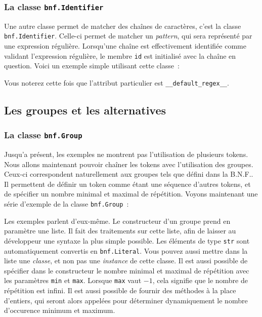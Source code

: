 \documentclass[a4paper]{article}
\newcommand{\insertpython}[1]{%
{\ttfamily}%
}
\newcommand{\fixed}[1]{\texttt{#1}}
\newcommand{\bnf}{B.N.F.}
\begin{document}
            \subsubsection{La classe \fixed{bnf.Identifier}}
                Une autre classe permet de matcher des chaînes de caractères,
                c'est la classe \fixed{bnf.Identifier}. Celle-ci permet de
                matcher un \emph{pattern}, qui sera représenté par une expression
                régulière. Lorsqu'une chaîne est effectivement identifiée comme
                validant l'expression régulière, le membre \fixed{id} est
                initialisé avec la chaîne en question.
                Voici un exemple simple utilisant cette classe~:
                \insertpython{listings/bnf/ex03.py}

                Vous noterez cette fois que l'attribut particulier est
                \fixed{\_\_default\_regex\_\_}.

        \subsection{Les groupes et les alternatives}

            \subsubsection{La classe \fixed{bnf.Group}}
                Jusqu'a présent, les exemples ne montrent pas l'utilisation de
                plusieurs tokens. Nous allons maintenant pouvoir chaîner les
                tokens avec l'utilisation des groupes. Ceux-ci correspondent
                naturellement aux groupes tels que défini dans la \bnf. Il
                permettent de définir un token comme étant une séquence d'autres
                tokens, et de spécifier un nombre minimal et maximal de répétition.
                Voyons maintenant une série d'exemple de la classe \fixed{bnf.Group}~:
                \insertpython{listings/bnf/ex04.py}

                Les exemples parlent d'eux-même. Le constructeur d'un groupe prend
                en paramètre une liste. Il fait des traitements sur cette liste,
                afin de laisser au développeur une syntaxe la plus simple possible.
                Les éléments de type \fixed{str} sont automatiquement convertis en
                \fixed{bnf.Literal}. Vous pouvez aussi mettre dans la liste une
                \emph{classe}, et non pas une \emph{instance} de cette classe.
                Il est aussi possible de spécifier dans le constructeur le
                nombre minimal et maximal de répétition avec les paramètres \fixed{min}
                et \fixed{max}. Lorsque \fixed{max}
                vaut $-1$, cela signifie que le nombre de répétition est infini.
                Il est aussi possible de fournir des méthodes à la place d'entiers,
                qui seront alors appelées pour déterminer dynamiquement le nombre
                d'occurence minimum et maximum.
\end{document}
